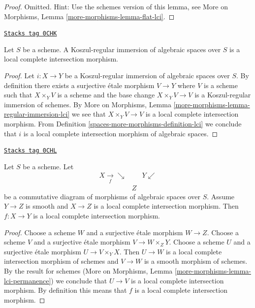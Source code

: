 \begin{proof}
Omitted. Hint: Use the schemes version of this lemma, see
More on Morphisms,
Lemma \ref{more-morphisms-lemma-flat-lci}.
\end{proof}

\begin{lemma}
\label{spaces-more-morphisms-lemma-regular-immersion-lci}
\href{https://stacks.math.columbia.edu/tag/0CHK}{\texttt{Stacks tag 0CHK}}

Let $S$ be a scheme. A Koszul-regular immersion of algebraic spaces
over $S$ is a local complete intersection morphism.
\end{lemma}

\begin{proof}
Let $i : X \to Y$ be a Koszul-regular immersion of algebraic spaces
over $S$. By definition there exists a surjective \'etale morphism
$V \to Y$ where $V$ is a scheme such that $X \times_Y V$ is a scheme
and the base change $X \times_Y V \to V$ is a Koszul-regular immersion of
schemes. By More on Morphisms, Lemma
\ref{more-morphisms-lemma-regular-immersion-lci} we see that
$X \times_Y V \to V$ is a local complete intersection morphism.
From Definition \ref{spaces-more-morphisms-definition-lci} we conclude that $i$ is a
local complete intersection morphism of algebraic spaces.
\end{proof}

\begin{lemma}
\label{spaces-more-morphisms-lemma-lci-permanence}
\href{https://stacks.math.columbia.edu/tag/0CHL}{\texttt{Stacks tag 0CHL}}

Let $S$ be a scheme. Let
$$
\begin{array}{ccc}X \underset{f}{\longrightarrow}\searrow &  & Y \swarrow \\  & Z & \end{array}
$$
be a commutative diagram of morphisms of algebraic spaces over $S$.
Assume $Y \to Z$ is smooth and $X \to Z$ is a
local complete intersection morphism.
Then $f : X \to Y$ is a local complete intersection morphism.
\end{lemma}

\begin{proof}
Choose a scheme $W$ and a surjective \'etale morphism $W \to Z$.
Choose a scheme $V$ and a surjective \'etale morphism $V \to W \times_Z Y$.
Choose a scheme $U$ and a surjective \'etale morphism $U \to V \times_Y X$.
Then $U \to W$ is a local complete intersection morphism of schemes and
$V \to W$ is a smooth morphism of schemes. By the result for schemes
(More on Morphisms, Lemma \ref{more-morphisms-lemma-lci-permanence})
we conclude that $U \to V$ is a local complete intersection morphism.
By definition this means that $f$ is a local complete intersection morphism.
\end{proof}

